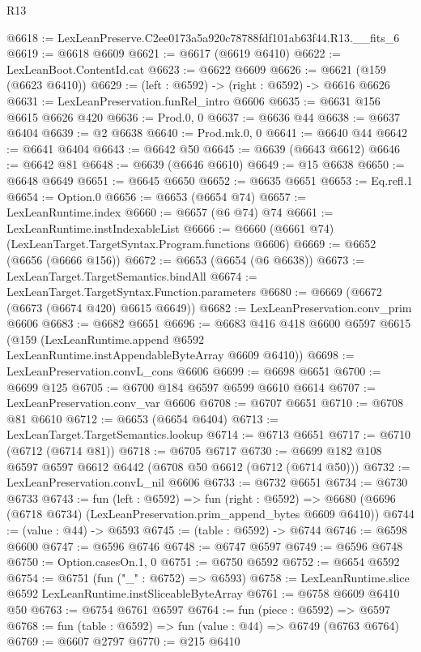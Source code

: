 \begin{lexlean}{R13}
\begin{coremodule}
@6618 := LexLeanPreserve.C2ee0173a5a920c78788fdf101ab63f44.R13.__fits_6
@6619 := @6618 @6609
@6621 := @6617 (@6619 @6410)
@6622 := LexLeanBoot.ContentId.cat
@6623 := @6622 @6609
@6626 := @6621 (@159 (@6623 @6410))
@6629 := (left : @6592) -> (right : @6592) -> @6616 @6626
@6631 := LexLeanPreservation.funRel_intro @6606
@6635 := @6631 @156 @6615 @6626 @420
@6636 := Prod.{0, 0}
@6637 := @6636 @44
@6638 := @6637 @6404
@6639 := @2 @6638
@6640 := Prod.mk.{0, 0}
@6641 := @6640 @44
@6642 := @6641 @6404
@6643 := @6642 @50
@6645 := @6639 (@6643 @6612)
@6646 := @6642 @81
@6648 := @6639 (@6646 @6610)
@6649 := @15 @6638
@6650 := @6648 @6649
@6651 := @6645 @6650
@6652 := @6635 @6651
@6653 := Eq.refl.{1}
@6654 := Option.{0}
@6656 := @6653 (@6654 @74)
@6657 := LexLeanRuntime.index
@6660 := @6657 (@6 @74) @74
@6661 := LexLeanRuntime.instIndexableList
@6666 := @6660 (@6661 @74) (LexLeanTarget.TargetSyntax.Program.functions @6606)
@6669 := @6652 (@6656 (@6666 @156))
@6672 := @6653 (@6654 (@6 @6638))
@6673 := LexLeanTarget.TargetSemantics.bindAll
@6674 := LexLeanTarget.TargetSyntax.Function.parameters
@6680 := @6669 (@6672 (@6673 (@6674 @420) @6615 @6649))
@6682 := LexLeanPreservation.conv_prim @6606
@6683 := @6682 @6651
@6696 := @6683
    @416
    @418
    @6600
    @6597
    @6615
    (@159 (LexLeanRuntime.append @6592 LexLeanRuntime.instAppendableByteArray @6609 @6410))
@6698 := LexLeanPreservation.convL_cons @6606
@6699 := @6698 @6651
@6700 := @6699 @125
@6705 := @6700 @184 @6597 @6599 @6610 @6614
@6707 := LexLeanPreservation.conv_var @6606
@6708 := @6707 @6651
@6710 := @6708 @81 @6610
@6712 := @6653 (@6654 @6404)
@6713 := LexLeanTarget.TargetSemantics.lookup
@6714 := @6713 @6651
@6717 := @6710 (@6712 (@6714 @81))
@6718 := @6705 @6717
@6730 := @6699 @182 @108 @6597 @6597 @6612 @6442 (@6708 @50 @6612 (@6712 (@6714 @50)))
@6732 := LexLeanPreservation.convL_nil @6606
@6733 := @6732 @6651
@6734 := @6730 @6733
@6743 := fun (left : @6592) =>
  fun (right : @6592) =>
  @6680 (@6696 (@6718 @6734) (LexLeanPreservation.prim_append_bytes @6609 @6410))
@6744 := (value : @44) -> @6593
@6745 := (table : @6592) -> @6744
@6746 := @6598 @6600
@6747 := @6596 @6746
@6748 := @6747 @6597
@6749 := @6596 @6748
@6750 := Option.casesOn.{1, 0}
@6751 := @6750 @6592
@6752 := @6654 @6592
@6754 := @6751 (fun ("_" : @6752) => @6593)
@6758 := LexLeanRuntime.slice @6592 LexLeanRuntime.instSliceableByteArray
@6761 := @6758 @6609 @6410 @50
@6763 := @6754 @6761 @6597
@6764 := fun (piece : @6592) => @6597
@6768 := fun (table : @6592) => fun (value : @44) => @6749 (@6763 @6764)
@6769 := @6607 @2797
@6770 := @215 @6410

\end{coremodule}
\end{lexlean}
